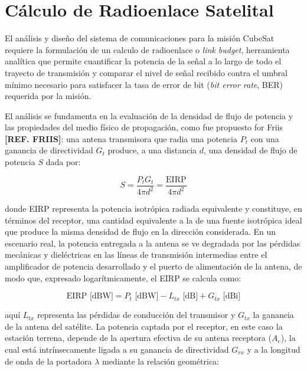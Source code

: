 \section{Cálculo de Radioenlace Satelital} \label{sec:radioenlace}
El análisis y diseño del sistema de comunicaciones para la misión CubeSat requiere la formulación de un calculo de radioenlace o \textit{link budget}, herramienta analítica que permite cuantificar la potencia de la señal a lo largo de todo el trayecto de transmisión y comparar el nivel de señal recibido contra el umbral mínimo necesario para satisfacer la tasa de error de bit (\textit{bit error rate}, BER) requerida por la misión.

El análisis se fundamenta en la evaluación de la densidad de flujo de potencia y las propiedades del medio físico de propagación, como fue propuesto for Friis \textbf{[REF. FRIIS]}: una antena transmisora que radia una potencia $P_t$ con una ganancia de directividad $G_t$ produce, a una distancia $d$, una densidad de flujo de potencia $S$ dada por:

\begin{equation}
    S = \frac{P_t G_t}{4\pi d^2} = \frac{\text{EIRP}}{4\pi d^2}
    \label{eq:densidad_flujo}
\end{equation}

donde EIRP representa la potencia isotrópica radiada equivalente y constituye, en términos del receptor, una cantidad equivalente a la de una fuente isotrópica ideal que produce la misma densidad de flujo en la dirección considerada. En un escenario real, la potencia entregada a la antena se ve degradada por las pérdidas mecánicas y dieléctricas en las líneas de transmisión intermedias entre el amplificador de potencia desarrollado y el puerto de alimentación de la antena, de modo que, expresado logarítmicamente, el EIRP se calcula como:

\begin{equation}
    \text{EIRP [dBW]} = P_t \text{ [dBW]} - L_{tx} \text{ [dB]} + G_{tx} \text{ [dBi]}
    \label{eq:eirp_analitico}
\end{equation}

aquí $L_{tx}$ representa las pérdidas de conducción del transmisor y $G_{tx}$ la ganancia de la antena del satélite. La potencia captada por el receptor, en este caso la estación terrena, depende de la apertura efectiva de su antena receptora ($A_e$), la cual está intrínsecamente ligada a su ganancia de directividad $G_{rx}$ y a la longitud de onda de la portadora $\lambda$ mediante la relación geométrica: 

